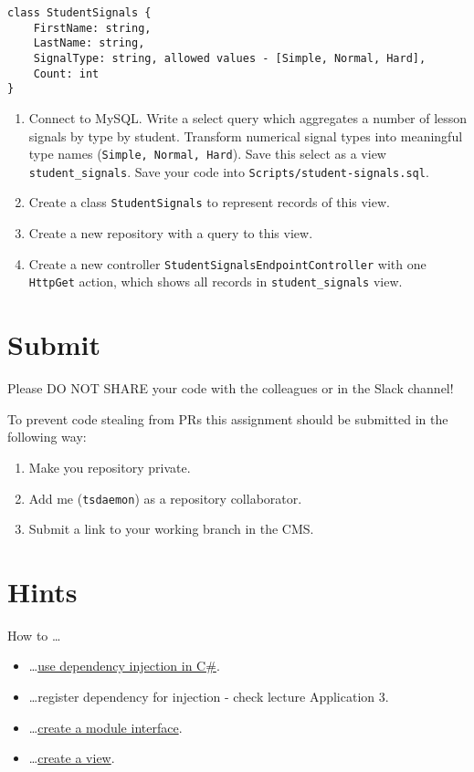\documentclass[12pt]{article}
\newcommand{\code}[1]{\texttt{#1}}
\begin{document}
\begin{verbatim}
class StudentSignals {
    FirstName: string,
    LastName: string,
    SignalType: string, allowed values - [Simple, Normal, Hard],
    Count: int
}
\end{verbatim}

\begin{enumerate}
\item Connect to MySQL. Write a select query which aggregates a number of lesson signals by type by student. Transform numerical signal types into meaningful type names (\code{Simple, Normal, Hard}). Save this select as a view \code{student\_signals}. Save your code into \code{Scripts/student-signals.sql}.
\item Create a class \code{StudentSignals} to represent records of this view.
\item Create a new repository with a query to this view.
\item Create a new controller \code{StudentSignalsEndpointController} with one \code{HttpGet} action, which shows all records in \code{student\_signals} view.
\end{enumerate}

\section*{Submit}

Please DO NOT SHARE your code with the colleagues or in the Slack channel!

To prevent code stealing from PRs this assignment should be submitted in the following way:
\begin{enumerate}
\item Make you repository private.
\item Add me (\code{tsdaemon}) as a repository collaborator.
\item Submit a link to your working branch in the CMS.
\end{enumerate}

\clearpage

\section*{Hints}
How to \dots
\begin{itemize}
\item \dots \href{https://docs.microsoft.com/en-us/aspnet/core/fundamentals/dependency-injection?view=aspnetcore-2.1}{use dependency injection in C\#}.
\item \dots register dependency for injection - check lecture Application 3.
\item \dots \href{https://www.codeproject.com/Articles/10197/The-Interface-Construct-in-C}{create a module interface}.
\item \dots \href{https://dev.mysql.com/doc/refman/8.0/en/create-view.html}{create a view}.

\end{itemize}
\end{document}
